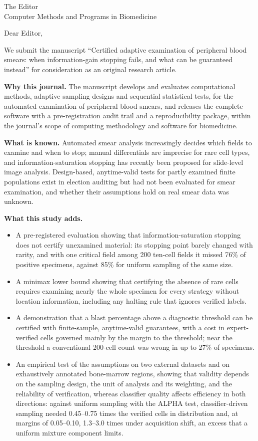 \documentclass[11pt]{letter}
\date{\today}
\begin{document}
\begin{letter}{The Editor\\Computer Methods and Programs in Biomedicine}
\opening{Dear Editor,}

We submit the manuscript ``Certified adaptive examination of peripheral blood smears: when information-gain stopping fails, and what can be guaranteed instead'' for consideration as an original research article.

\textbf{Why this journal.} The manuscript develops and evaluates computational methods, adaptive sampling designs and sequential statistical tests, for the automated examination of peripheral blood smears, and releases the complete software with a pre-registration audit trail and a reproducibility package, within the journal's scope of computing methodology and software for biomedicine.

\textbf{What is known.} Automated smear analysis increasingly decides which fields to examine and when to stop; manual differentials are imprecise for rare cell types, and information-saturation stopping has recently been proposed for slide-level image analysis. Design-based, anytime-valid tests for partly examined finite populations exist in election auditing but had not been evaluated for smear examination, and whether their assumptions hold on real smear data was unknown.

\textbf{What this study adds.}
\begin{itemize}
\item A pre-registered evaluation showing that information-saturation stopping does not certify unexamined material: its stopping point barely changed with rarity, and with one critical field among 200 ten-cell fields it missed 76\% of positive specimens, against 85\% for uniform sampling of the same size.
\item A minimax lower bound showing that certifying the absence of rare cells requires examining nearly the whole specimen for every strategy without location information, including any halting rule that ignores verified labels.
\item A demonstration that a blast percentage above a diagnostic threshold can be certified with finite-sample, anytime-valid guarantees, with a cost in expert-verified cells governed mainly by the margin to the threshold; near the threshold a conventional 200-cell count was wrong in up to 27\% of specimens.
\item An empirical test of the assumptions on two external datasets and on exhaustively annotated bone-marrow regions, showing that validity depends on the sampling design, the unit of analysis and its weighting, and the reliability of verification, whereas classifier quality affects efficiency in both directions: against uniform sampling with the ALPHA test, classifier-driven sampling needed 0.45--0.75 times the verified cells in distribution and, at margins of 0.05--0.10, 1.3--3.0 times under acquisition shift, an excess that a uniform mixture component limits.
\end{itemize}


\end{letter}
\end{document}
